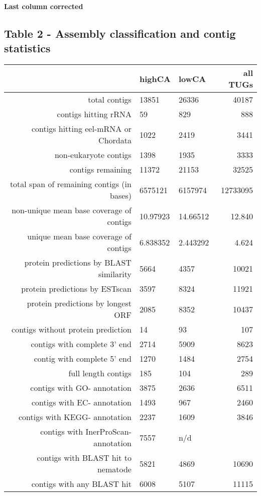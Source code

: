\documentclass[10pt]{bmc_article}
\newenvironment{bmcformat}{\begin{raggedright}\baselineskip20pt\sloppy\setboolean{publ}{false}}{\end{raggedright}\baselineskip20pt\sloppy}
\begin{document}
\begin{bmcformat}
\textbf{Last column corrected}


\subsection*{Table 2 - Assembly classification and contig statistics}

\begin{table}[ht]
\begin{center}
\begin{tabular}{rllr}
  \hline
 & highCA & lowCA & all TUGs \\ 
  \hline
total contigs & 13851 & 26336 & 40187 \\ 
  contigs hitting rRNA &  59 & 829 & 888 \\ 
  contigs hitting eel-mRNA or Chordata & 1022 & 2419 & 3441 \\ 
  non-eukaryote contigs & 1398 & 1935 & 3333 \\ 
  contigs remaining & 11372 & 21153 & 32525 \\ 
  total span of remaining contigs (in bases) & 6575121 & 6157974 & 12733095 \\ 
  non-unique mean base coverage of contigs & 10.97923 & 14.66512 & 12.840 \\ 
  unique mean base coverage of contigs & 6.838352 & 2.443292 & 4.624 \\ 
  protein predictions by BLAST similarity & 5664 & 4357 & 10021 \\ 
  protein predictions by ESTscan & 3597 & 8324 & 11921 \\ 
  protein predictions by longest ORF & 2085 & 8352 & 10437 \\ 
  contigs without protein prediction &   14 &   93 & 107 \\ 
  contigs with complete 3' end & 2714 & 5909 & 8623 \\ 
  contig with complete 5' end & 1270 & 1484 & 2754 \\ 
  full length contigs & 185 & 104 & 289 \\ 
  contigs with GO- annotation & 3875 & 2636 & 6511 \\ 
  contigs with EC- annotation & 1493 &  967 & 2460 \\ 
  contigs with KEGG- annotation & 2237 & 1609 & 3846 \\ 
  contigs with InerProScan- annotation & 7557 & n/d &  \\ 
  contigs with BLAST hit to nematode & 5821 & 4869 & 10690 \\ 
  contigs with any BLAST hit & 6008 & 5107 & 11115 \\ 
   \hline
\end{tabular}
\end{center}
\end{table}
\newpage


\end{bmcformat}
\end{document}
